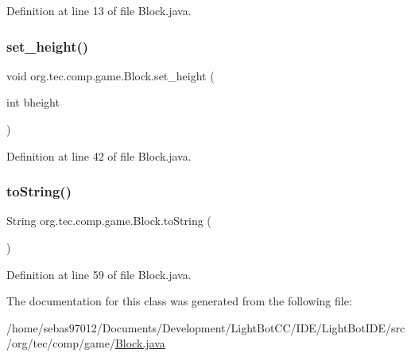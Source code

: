 Definition at line 13 of file Block.\+java.

\mbox{\label{classorg_1_1tec_1_1comp_1_1game_1_1_block_a17d0c6c7e15dabbe80be037e520f3f04}} 
\subsubsection{\texorpdfstring{set\+\_\+height()}{set\_height()}}
{\footnotesize\ttfamily void org.\+tec.\+comp.\+game.\+Block.\+set\+\_\+height (\begin{DoxyParamCaption}\item[{int}]{bheight }\end{DoxyParamCaption})\hspace{0.3cm}{\ttfamily [inline]}}



Definition at line 42 of file Block.\+java.

\mbox{\label{classorg_1_1tec_1_1comp_1_1game_1_1_block_a5f578cf17605556a0bf2ff93037e21f8}} 
\subsubsection{\texorpdfstring{to\+String()}{toString()}}
{\footnotesize\ttfamily String org.\+tec.\+comp.\+game.\+Block.\+to\+String (\begin{DoxyParamCaption}{ }\end{DoxyParamCaption})\hspace{0.3cm}{\ttfamily [inline]}}



Definition at line 59 of file Block.\+java.



The documentation for this class was generated from the following file\+:\begin{DoxyCompactItemize}
\item 
/home/sebas97012/\+Documents/\+Development/\+Light\+Bot\+C\+C/\+I\+D\+E/\+Light\+Bot\+I\+D\+E/src/org/tec/comp/game/\mbox{\hyperlink{_block_8java}{Block.\+java}}\end{DoxyCompactItemize}
